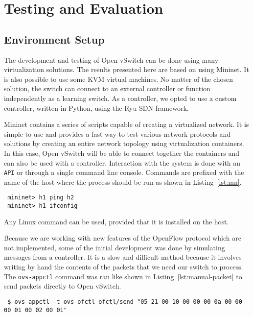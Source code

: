 \chapter{Testing and Evaluation}
\label{chapter:test-eval}

\section{Environment Setup}
\label{section:setup}

The development and testing of Open vSwitch can be done using many virtualization solutions. The
results presented here are based on using Mininet\cite{mn}. It is also possible to use some KVM\cite{kvm}
virtual machines. No matter of the chosen solution, the switch can connect to an
external controller or function independently as a learning switch. As a controller, we opted
to use a custom controller, written in Python, using the Ryu\cite{ryu} SDN framework.

Mininet contains a series of scripts capable of creating a virtualized network. It is simple to
use and provides a fast way to test various network protocols and solutions by creating
an entire network topology using virtualization containers. In this case, Open vSwitch will
be able to connect together the containers and can also be used with a controller.
Interaction with the system is done with an \texttt{API} or through a single command line console.
Commands are prefixed with the name of the host where the process should be run as shown in
Listing~\ref{lst:mn}.
\lstset{caption=Mininet Command Line,label=lst:mn}
\begin{lstlisting}
 mininet> h1 ping h2
 mininet> h1 ifconfig
\end{lstlisting}
Any Linux command can be used, provided that it is installed on the host.

Because we are working with new features of the OpenFlow protocol which are not implemented, some of
the initial development was done by simulating messages from a controller. It is a slow and difficult method
because it involves writing by hand the contents of the packets that we need our switch to process.
The \texttt{ovs-appctl} command was ran like shown in Listing~\ref{lst:manual-packet} to send packets
directly to Open vSwitch.

\lstset{caption=Manually Sending OpenFlow Messages,label=lst:manual-packet}
\begin{lstlisting}
 $ ovs-appctl -t ovs-ofctl ofctl/send "05 21 00 10 00 00 00 0a 00 00 00 01 00 02 00 01"
\end{lstlisting}

